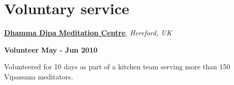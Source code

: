 \section{Voluntary service}
%
% 
% 
% 
%
\href{http://www.dipa.dhamma.org/}{\textbf{Dhamma
Dipa Meditation Centre}}, \textit{Hereford, UK}
%
\begin{outerlist}
\item[\FA \faAngleDoubleRight] \textbf{Volunteer}%
        \hfill \textbf{May - Jun 2010}
\end{outerlist}

\begin{innerlist}
\item Volunteered for 10 days as part of a kitchen team serving more than 150
Vipassana meditators.
\end{innerlist}

% 

% 
% 
% 

